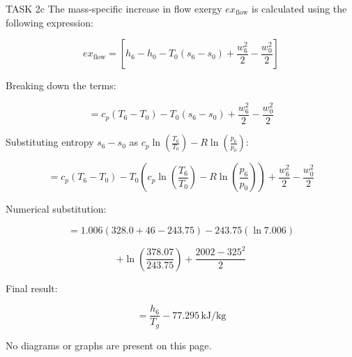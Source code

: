 TASK 2c  
The mass-specific increase in flow exergy \( ex_{\text{flow}} \) is calculated using the following expression:  

\[
ex_{\text{flow}} = \left[ h_6 - h_0 - T_0 (s_6 - s_0) + \frac{w_6^2}{2} - \frac{w_0^2}{2} \right]
\]

Breaking down the terms:  

\[
= c_p (T_6 - T_0) - T_0 (s_6 - s_0) + \frac{w_6^2}{2} - \frac{w_0^2}{2}
\]

Substituting entropy \( s_6 - s_0 \) as \( c_p \ln \left( \frac{T_6}{T_0} \right) - R \ln \left( \frac{p_6}{p_0} \right) \):  

\[
= c_p (T_6 - T_0) - T_0 \left( c_p \ln \left( \frac{T_6}{T_0} \right) - R \ln \left( \frac{p_6}{p_0} \right) \right) + \frac{w_6^2}{2} - \frac{w_0^2}{2}
\]

Numerical substitution:  

\[
= 1.006 (328.0 + 46 - 243.75) - 243.75 \left( \ln 7.006 \right)
\]

\[
+ \ln \left( \frac{378.07}{243.75} \right) + \frac{2002 - 325^2}{2}
\]

Final result:  

\[
= \frac{h_6}{T_g} - 77.295 \, \text{kJ/kg}
\]  

No diagrams or graphs are present on this page.